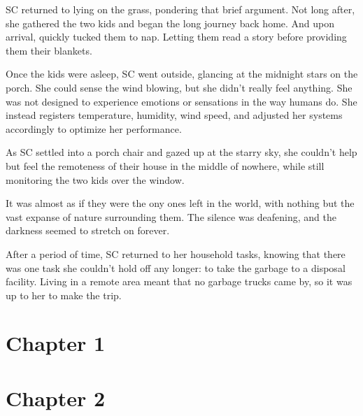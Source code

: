 \documentclass[12pt]{book}
\begin{document}
\clearpage

SC returned to lying on the grass, pondering that brief
argument. Not long after, she gathered the two kids and
began the long journey back home. And upon arrival,
quickly tucked them to nap. Letting them read a story
before providing them their blankets.

Once the kids were asleep, SC went outside, glancing at
the midnight stars on the porch. She could sense the wind
blowing, but she didn't really feel anything. She was not
designed to experience emotions or sensations in the way
humans do. She instead registers temperature, humidity,
wind speed, and adjusted her systems accordingly to
optimize her performance.

As SC settled into a porch chair and gazed up at the
starry sky, she couldn't help but feel the remoteness of
their house in the middle of nowhere, while still
monitoring the two kids over the window.

It was almost as if they were the ony ones left in the
world, with nothing but the vast expanse of nature
surrounding them. The silence was deafening, and the
darkness seemed to stretch on forever.

After a period of time, SC returned to her household
tasks, knowing that there was one task she couldn't hold
off any longer: to take the garbage to a disposal
facility. Living in a remote area meant that no garbage
trucks came by, so it was up to her to make the trip.

\section*{Chapter 1}

\section*{Chapter 2}
\end{document}
